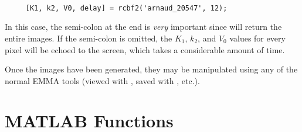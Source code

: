 \begin{verbatim}

     [K1, k2, V0, delay] = rcbf2('arnaud_20547', 12);

\end{verbatim}

In this case, the semi-colon at the end is {\em very} important since
 will return the entire images.  If the semi-colon is
omitted, the $K_1$, $k_2$, and $V_0$ values for every pixel will be
echoed to the screen, which takes a considerable amount of time.

Once the images have been generated, they may be manipulated using
any of the normal EMMA tools (viewed with , saved
with , etc.).


\newpage
\section{MATLAB Functions}










